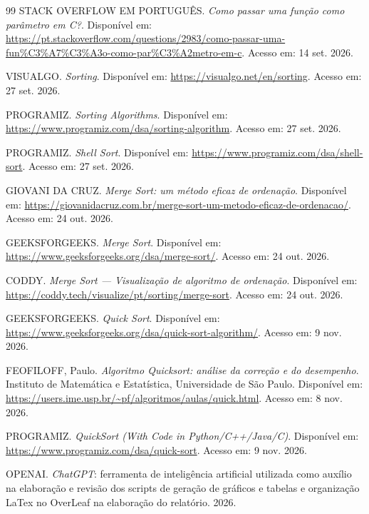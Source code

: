 \begin{thebibliography}{99}
STACK OVERFLOW EM PORTUGUÊS.
\textit{Como passar uma função como parâmetro em C?}.
Disponível em:
\url{https://pt.stackoverflow.com/questions/2983/como-passar-uma-fun%C3%A7%C3%A3o-como-par%C3%A2metro-em-c}.
Acesso em: 14 set. 2026.

VISUALGO.
\textit{Sorting}.
Disponível em:
\url{https://visualgo.net/en/sorting}.
Acesso em: 27 set. 2026.

PROGRAMIZ.
\textit{Sorting Algorithms}.
Disponível em:
\url{https://www.programiz.com/dsa/sorting-algorithm}.
Acesso em: 27 set. 2026.

PROGRAMIZ.
\textit{Shell Sort}.
Disponível em:
\url{https://www.programiz.com/dsa/shell-sort}.
Acesso em: 27 set. 2026.

GIOVANI DA CRUZ.
\textit{Merge Sort: um método eficaz de ordenação}.
Disponível em:
\url{https://giovanidacruz.com.br/merge-sort-um-metodo-eficaz-de-ordenacao/}.
Acesso em: 24 out. 2026.

GEEKSFORGEEKS.
\textit{Merge Sort}.
Disponível em:
\url{https://www.geeksforgeeks.org/dsa/merge-sort/}.
Acesso em: 24 out. 2026.

CODDY.
\textit{Merge Sort — Visualização de algoritmo de ordenação}.
Disponível em:
\url{https://coddy.tech/visualize/pt/sorting/merge-sort}.
Acesso em: 24 out. 2026.

GEEKSFORGEEKS.
\textit{Quick Sort}.
Disponível em:
\url{https://www.geeksforgeeks.org/dsa/quick-sort-algorithm/}.
Acesso em: 9 nov. 2026.

FEOFILOFF, Paulo.
\textit{Algoritmo Quicksort: análise da correção e do desempenho}.
Instituto de Matemática e Estatística, Universidade de São Paulo.
Disponível em:
\url{https://users.ime.usp.br/~pf/algoritmos/aulas/quick.html}.
Acesso em: 8 nov. 2026.

PROGRAMIZ.
\textit{QuickSort (With Code in Python/C++/Java/C)}.
Disponível em:
\url{https://www.programiz.com/dsa/quick-sort}.
Acesso em: 9 nov. 2026.

OPENAI.
\textit{ChatGPT}: ferramenta de inteligência artificial utilizada como
auxílio na elaboração e revisão dos scripts de geração de gráficos e tabelas e organização LaTex no OverLeaf na elaboração do relatório.
2026.


\end{thebibliography}